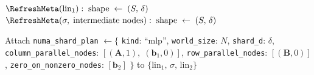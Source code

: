 \begin{algorithm}[t]
{    \BlankLine
    $\RefreshMeta(\text{lin}_1):\; \text{shape} \;\leftarrow\; (S,\,\delta)$\;
    $\RefreshMeta(\sigma,\;\text{intermediate nodes}):\; \text{shape} \;\leftarrow\; (S,\,\delta)$\;

    \BlankLine
    Attach \texttt{numa\_shard\_plan} $\leftarrow \{$
        \texttt{kind}: ``mlp'',\;
        \texttt{world\_size}: $N$,\;
        \texttt{shard\_d}: $\delta$,\;
        \texttt{column\_parallel\_nodes}: $[(\mathbf{A},1),\;(\mathbf{b}_1,0)]$,\;
        \texttt{row\_parallel\_nodes}: $[(\mathbf{B},0)]$,\;
        \texttt{zero\_on\_nonzero\_nodes}: $[\mathbf{b}_2]$ $\}$
        to $\{\text{lin}_1,\,\sigma,\,\text{lin}_2\}$\;
}
\end{algorithm}

